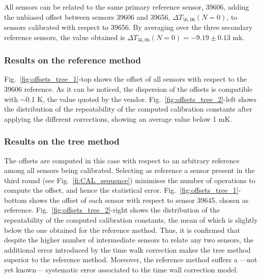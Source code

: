 All sensors can be related to the same primary reference sensor, 39606, adding  the unbiased offset between sensors 39606 and 39656,  $\Delta T_{56,06}(N=0)$, to sensors calibrated with respect to 39656. By averaging over the three secondary reference sensors, the value obtained is $\Delta T_{56,06}(N=0)=-9.19\pm0.13$ mk.

\subsubsection{Results on the reference method}
\label{sec:results_reference}
\noindent Fig.~\ref{fig:offsets_tree_1}-top shows the offset of all sensors with respect to the 39606 reference. As it can be noticed, the dispersion of the offsets is compatible with $\sim$0.1 K, the value quoted by the vendor. Fig.~\ref{fig:offsets_tree_2}-left shows the distribution of the repeatability of the computed calibration constants after applying the different corrections, showing an average value below 1 mK.

\subsubsection{Results on the tree method}
\noindent The offsets are computed in this case with respect to an arbitrary reference among all sensors being calibrated. Selecting as reference a sensor present in the third round (see Fig.~\ref{fi:CAL_sequence}) minimises the number of operations to compute the offset, and hence the statistical error. Fig.~\ref{fig:offsets_tree_1}-bottom shows the offset of each sensor with respect to sensor 39645, chosen as reference. Fig.~\ref{fig:offsets_tree_2}-right shows the distribution of the repeatability of the computed calibration constants, the mean of which is slightly below the one obtained for the reference method. Thus, it is confirmed that despite the higher number of intermediate sensors to relate any two sensors, the additional error introduced by the time walk correction makes the tree method superior to the reference method. Moreover, the reference method suffers a ---not yet known--- systematic error associated to the time wall correction model. 

